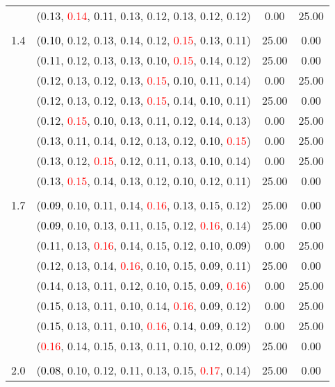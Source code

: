 \documentclass[10pt,a4paper]{report}
\begin{document}
\begin{center}
\begin{longtable}{clcc}
			&(0.13, \textcolor{red}{0.14}, \textcolor{black}{0.11}, 0.13, 0.12, 0.13, 0.12, 0.12)&0.00&25.00\\
		&&&\\
		1.4			&(\textcolor{black}{0.10}, 0.12, 0.13, 0.14, 0.12, \textcolor{red}{0.15}, 0.13, 0.11)&25.00&0.00\\
			&(0.11, 0.12, 0.13, 0.13, \textcolor{black}{0.10}, \textcolor{red}{0.15}, 0.14, 0.12)&25.00&0.00\\
			&(0.12, 0.13, 0.12, 0.13, \textcolor{red}{0.15}, \textcolor{black}{0.10}, 0.11, 0.14)&0.00&25.00\\
			&(0.12, 0.13, 0.12, 0.13, \textcolor{red}{0.15}, 0.14, \textcolor{black}{0.10}, 0.11)&25.00&0.00\\
			&(0.12, \textcolor{red}{0.15}, \textcolor{black}{0.10}, 0.13, 0.11, 0.12, 0.14, 0.13)&0.00&25.00\\
			&(0.13, 0.11, 0.14, 0.12, 0.13, 0.12, \textcolor{black}{0.10}, \textcolor{red}{0.15})&0.00&25.00\\
			&(0.13, 0.12, \textcolor{red}{0.15}, 0.12, 0.11, 0.13, \textcolor{black}{0.10}, 0.14)&0.00&25.00\\
			&(0.13, \textcolor{red}{0.15}, 0.14, 0.13, 0.12, \textcolor{black}{0.10}, 0.12, 0.11)&25.00&0.00\\
		&&&\\
		1.7			&(\textcolor{black}{0.09}, 0.10, 0.11, 0.14, \textcolor{red}{0.16}, 0.13, 0.15, 0.12)&25.00&0.00\\
			&(\textcolor{black}{0.09}, 0.10, 0.13, 0.11, 0.15, 0.12, \textcolor{red}{0.16}, 0.14)&25.00&0.00\\
			&(0.11, 0.13, \textcolor{red}{0.16}, 0.14, 0.15, 0.12, 0.10, \textcolor{black}{0.09})&0.00&25.00\\
			&(0.12, 0.13, 0.14, \textcolor{red}{0.16}, 0.10, 0.15, \textcolor{black}{0.09}, 0.11)&25.00&0.00\\
			&(0.14, 0.13, 0.11, 0.12, 0.10, 0.15, \textcolor{black}{0.09}, \textcolor{red}{0.16})&0.00&25.00\\
			&(0.15, 0.13, 0.11, 0.10, 0.14, \textcolor{red}{0.16}, \textcolor{black}{0.09}, 0.12)&0.00&25.00\\
			&(0.15, 0.13, 0.11, 0.10, \textcolor{red}{0.16}, 0.14, \textcolor{black}{0.09}, 0.12)&0.00&25.00\\
			&(\textcolor{red}{0.16}, 0.14, 0.15, 0.13, 0.11, 0.10, 0.12, \textcolor{black}{0.09})&25.00&0.00\\
		&&&\\
		2.0			&(\textcolor{black}{0.08}, 0.10, 0.12, 0.11, 0.13, 0.15, \textcolor{red}{0.17}, 0.14)&25.00&0.00\\

\end{longtable}
\end{center}
\end{document}
